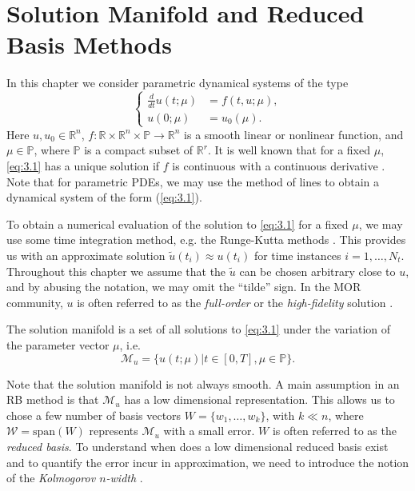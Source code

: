 \section{Solution Manifold and Reduced Basis Methods} \label{sec:3.1}
In this chapter we consider parametric dynamical systems of the type
\begin{equation} \label{eq:3.1}
\left\{
\begin{aligned}
	\frac d{dt} u(t;\mu) &= f(t,u;\mu),\\
	u(0;\mu) &= u_0(\mu).
\end{aligned}
\right.
\end{equation}
Here $u,u_0\in \mathbb R^{n}$, $f:\mathbb R \times \mathbb R^{n} \times \mathbb P\to \mathbb R^{n}$ is a smooth linear or nonlinear function, and $\mu \in \mathbb P$, where $\mathbb P$ is a compact subset of $\mathbb R^r$. It is well known that for a fixed $\mu$, \cref{eq:3.1} has a unique solution if $f$ is continuous with a continuous derivative \cite{rudin1976principles}. Note that for parametric PDEs, we may use the method of lines \cite{edsberg2015introduction} to obtain a dynamical system of the form (\ref{eq:3.1}).

To obtain a numerical evaluation of the solution to \cref{eq:3.1} for a fixed $\mu$, we may use some time integration method, e.g. the Runge-Kutta methods \cite{edsberg2015introduction}. This provides us with an approximate solution $\tilde u(t_i) \approx u(t_i)$ for time instances $i = 1 , \dots , N_t$. Throughout this chapter we assume that the $\tilde u$ can be chosen arbitrary close to $u$, and by abusing the notation, we may omit the ``tilde'' sign. In the MOR community, $u$ is often referred to as the \emph{full-order} or the \emph{high-fidelity} solution \cite{hesthaven2015certified,quarteroni2015reduced}. 

\begin{definition}
The solution manifold is a set of all solutions to \cref{eq:3.1} under the variation of the parameter vector $\mu$, i.e.
\begin{equation} \label{eq:3.2}
	\mathcal M_{u} = \{ u(t;\mu) | t \in [0,T] , \mu \in \mathbb P \}.
\end{equation}
\end{definition}
Note that the solution manifold is not always smooth. A main assumption in an RB method is that $\mathcal M_{u}$ has a low dimensional representation. This allows us to chose a few number of basis vectors $W = \{ w_1,\dots,w_k\}$, with $k\ll n$, where $\mathcal W = \text{span}(W)$ represents $\mathcal M_{u}$ with a small error. $W$ is often referred to as the \emph{reduced basis}. To understand when does a low dimensional reduced basis exist and to quantify the error incur in approximation, we need to introduce the notion of the \emph{Kolmogorov $n$-width} \cite{pinkus1985n}.

